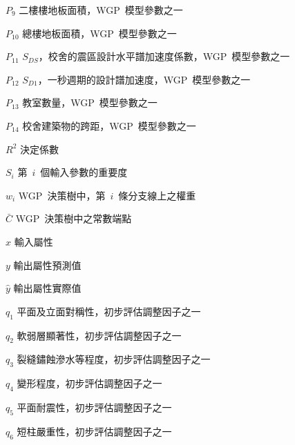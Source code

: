 \begin{SymEntry}
\item[$P_9$]
二樓樓地板面積，WGP~模型參數之一

\item[$P_{10}$]
總樓地板面積，WGP~模型參數之一

\item[$P_{11}$]
$S_{DS}$，校舍的震區設計水平譜加速度係數，WGP~模型參數之一

\item[$P_{12}$]
$S_{D1}$，一秒週期的設計譜加速度，WGP~模型參數之一

\item[$P_{13}$]
教室數量，WGP~模型參數之一

\item[$P_{14}$]
校舍建築物的跨距，WGP~模型參數之一

\item[$R^2$]
決定係數

\item[$S_i$]
第~$i$~個輸入參數的重要度

\item[$w_i$]
WGP~決策樹中，第~$i$~條分支線上之權重

\item[$\bar{C}$]
WGP~決策樹中之常數端點

\item[$x$]
輸入屬性

\item[$y$]
輸出屬性預測值

\item[$\hat{y}$]
輸出屬性實際值

\item[$q_1$]
平面及立面對稱性，初步評估調整因子之一

\item[$q_2$]
軟弱層顯著性，初步評估調整因子之一

\item[$q_3$]
裂縫鏽蝕滲水等程度，初步評估調整因子之一

\item[$q_4$]
變形程度，初步評估調整因子之一

\item[$q_5$]
平面耐震性，初步評估調整因子之一

\item[$q_6$]
短柱嚴重性，初步評估調整因子之一

\end{SymEntry}